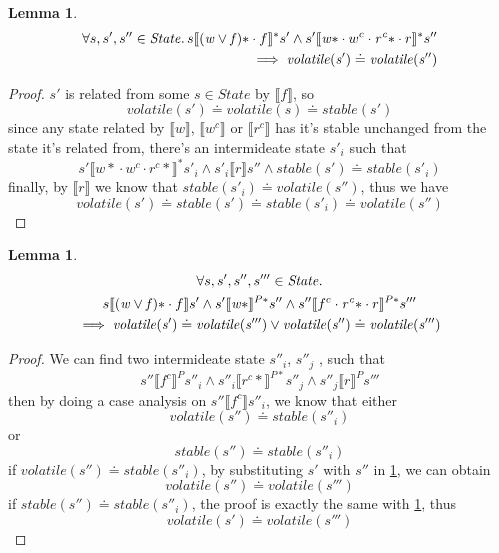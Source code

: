 \documentclass[a4paper,11pt]{article}
\newtheorem{lemma}[theorem]{Lemma}
\theoremstyle{definition}
\begin{document}
\begin{lemma} \label{lemma-2-1}
\begin{align*}
	\forall s, s', s'' \in \mathit{State} \ldotp s \llbracket \mathit{(w \lor f)\ast} \cdot f \rrbracket^* s' \land s' \llbracket \mathit{w\ast} \cdot w^c \cdot \mathit{r^c\ast} \cdot r \rrbracket^* s'' \\
	  \implies \mathit{volatile(s')} \doteq \mathit{volatile(s'')}
\end{align*}
\end{lemma}
\begin{proof}
	$s'$ is related from some $s \in \mathit{State}$ by $\llbracket f \rrbracket$, so
		$$\mathit{volatile(s')} \doteq \mathit{volatile(s)} \doteq \mathit{stable(s')}$$
	since any state related by $\llbracket w \rrbracket$, $\llbracket w^c \rrbracket$ or $\llbracket r^c \rrbracket$ has it's stable unchanged from the state it's related from, there's an intermideate state $s'_i$ such that 
		$$s' \llbracket {w*} \cdot w^c \cdot {r^c *} \rrbracket^* s'_i \land s'_i \llbracket r \rrbracket s'' \land stable(s') \doteq stable(s'_i)$$
	finally, by $\llbracket r \rrbracket$ we know that $\mathit{stable(s'_i) \doteq volatile(s'')}$, thus we have
		$$\mathit{volatile(s') \doteq stable(s') \doteq stable(s'_i) \doteq volatile(s'')}$$
\end{proof}

\begin{lemma} \label{lemma-2-2}
\begin{multline*}
      \forall s, s', s'', s''' \in \mathit{State} \ldotp \\ 
      s \llbracket \mathit{(w \lor f)\ast} \cdot f \rrbracket s' \land
	  s' \llbracket \mathit{w\ast} \rrbracket^{P*} s'' \land 
	  s'' \llbracket f^c \cdot \mathit{r^c\ast} \cdot r \rrbracket^{P*} s'''\\ \implies \mathit{volatile(s')} \doteq \mathit{volatile(s''')} \lor \mathit{volatile(s'')} \doteq \mathit{volatile(s''')}
\end{multline*}
\end{lemma}
\begin{proof}
	We can find two intermideate state $s''_i$, $s''_j$ , such that $$s'' \llbracket f^c \rrbracket^P s''_i \land s''_i \llbracket r^c* \rrbracket^{P*} s''_j \land s''_j \llbracket r \rrbracket^P s'''$$
	then by doing a case analysis on $s'' \llbracket f^c \rrbracket s''_i$, we know that either $$\mathit{volatile(s'') \doteq stable(s''_i)}$$ or $$\mathit{stable(s'') \doteq stable(s''_i)}$$
	if $\mathit{volatile(s'') \doteq stable(s''_i)}$, by substituting $s'$ with $s''$ in \ref{lemma-2-1}, we can obtain $$\mathit{volatile(s'') \doteq volatile(s''')}$$
	if $\mathit{stable(s'') \doteq stable(s''_i)}$, the proof is exactly the same with \ref{lemma-2-1}, thus $$\mathit{volatile(s') \doteq volatile(s''')}$$
\end{proof}
\end{document}
